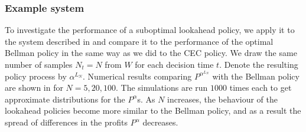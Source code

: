 \documentclass[main.tex]{subfiles}
\begin{document}
\subsubsection{Example system}
To investigate the performance of a suboptimal lookahead
policy, we apply it to the system described in
 and compare it to the performance
of the optimal Bellman policy in the same way as we did to the CEC
policy. We draw the same number of samples $N_t=N$ from $W$ for each
decision time $t$. Denote the resulting policy process
by $\alpha^{L_N}$. Numerical results comparing $P^{\alpha^{L_N}}$ with the
Bellman policy are shown in 
for $N=5,20,100$. The simulations are run $1000$ times each to get
approximate distributions for the $P^\alpha$s.
As $N$ increases, the behaviour of the lookahead policies become more
similar to the Bellman policy, and as a result the spread of differences in the
profits $P^\alpha$ decreases.
\end{document}
